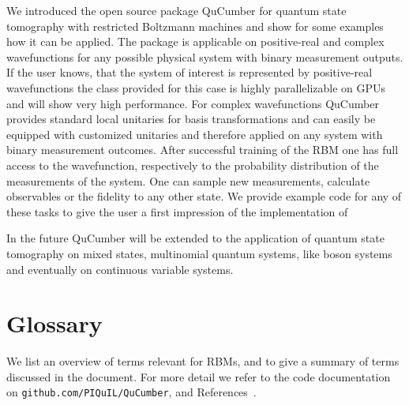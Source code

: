\documentclass[submission, Phys]{SciPost}
\begin{document}
We introduced the open source package QuCumber for quantum state tomography with restricted Boltzmann machines and show for some examples how it can be applied. The package is applicable on positive-real and complex wavefunctions for any
possible physical system with binary measurement outputs. If the user knows, that the system of interest is represented by positive-real wavefunctions the class provided for this case is highly parallelizable on GPUs and will show very high performance. For complex wavefunctions QuCumber provides standard local unitaries for basis transformations and can easily be equipped with customized unitaries and therefore applied on any system with binary measurement outcomes.
After successful training of the RBM one has full access to the wavefunction, respectively to the probability distribution of the measurements of the system. One can sample new measurements, calculate observables or the fidelity to any other state. We provide example code for any of these tasks to give the user a first impression of the implementation of 

In the future QuCumber will be extended to the application of quantum state tomography on mixed states, multinomial quantum systems, like boson systems and eventually on continuous variable systems.

\section{Glossary}

We list an overview of terms relevant for RBMs, and to give a summary of terms discussed in the document.  For more detail we refer to the code documentation on \verb|github.com/PIQuIL/QuCumber|, and References~\cite{hinton2002training, hinton2012practical}.
\end{document}
